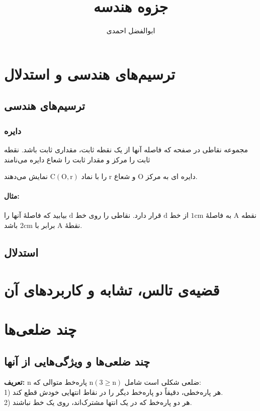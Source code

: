 \documentclass[12pt, a4paper]{book}
\title{جزوه هندسه}
\author{ابوالفضل احمدی}
\begin{document}
	\maketitle
	\setcounter{page}{1}
\chapter{ترسیم‌های هندسی و استدلال}

\section{ترسیم‌های هندسی}

\subsection{دایره}
مجموعه نقاطی در صفحه که فاصله آنها از یک نقطه ثابت، مقداری ثابت باشد. نقطه ثابت را مرکز و مقدار ثابت را شعاع دایره می‌نامند

دایره ای به مرکز
 $\mathrm{O}$
  و شعاع
   $\mathrm{r}$
    را با نماد
 $\mathrm{C}(\mathrm{O},\mathrm{r})$
  نمایش می‌دهند.

\subsubsection*{مثال:}
نقطه 
$\mathrm{A}$
به فاصلۀ
$\mathrm{1cm}$
از خط 
$\mathrm{d}$
قرار دارد. نقاطی را روی خط
$\mathrm{d}$
بیابید که فاصلۀ آنها را نقطۀ
$\mathrm{A}$
برابر با
$\mathrm{2cm}$
باشد.

\section{استدلال}

\chapter{قضیه‌ی تالس، تشابه و کاربردهای آن}


\chapter{چند ضلعی‌ها}

\section{چند ضلعی‌ها و ویژگی‌هایی از آنها}

\textbf{تعریف:}
n
ضلعی شکلی است شامل 
$\text{n}(\mbox{3} \geq \text{n})$
پاره‌خط متوالی که:\\
1) هر پاره‌خطی، دقیقاً دو پاره‌خط دیگر را در نقاط انتهایی خودش قطع کند.\\
2) هر دو پاره‌خط که در یک انتها مشترک‌اند، روی یک خط نباشند.
\end{document}
